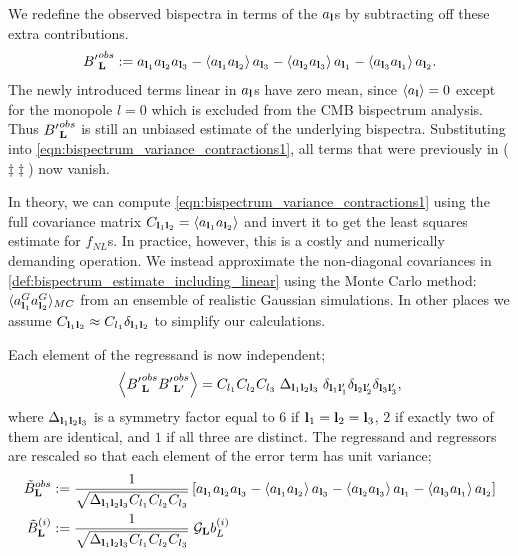We redefine the observed bispectra in terms of the $a_\mathbf{l}$s by subtracting off these extra contributions.
\begin{align}
	{B'}^{obs}_\mathbf{L} := a_{\mathbf{l}_1} a_{\mathbf{l}_2} a_{\mathbf{l}_3} - \left< a_{\mathbf{l}_1} a_{\mathbf{l}_2} \right> a_{\mathbf{l}_3} - \left< a_{\mathbf{l}_2} a_{\mathbf{l}_3} \right> a_{\mathbf{l}_1} - \left< a_{\mathbf{l}_3} a_{\mathbf{l}_1} \right> a_{\mathbf{l}_2}. \label{def:bispectrum_estimate_including_linear}
\end{align}
The newly introduced terms linear in $a_\mathbf{l}$s have zero mean, since $\left< a_\mathbf{l} \right> = 0$ except for the monopole $l=0$ which is excluded from the CMB bispectrum analysis. Thus ${B'}^{obs}_\mathbf{L}$ is still an unbiased estimate of the underlying bispectra. Substituting into \eqref{eqn:bispectrum_variance_contractions1}, all terms that were previously in ($\ddagger\ddagger$) now vanish.

In theory, we can compute \eqref{eqn:bispectrum_variance_contractions1} using the full covariance matrix $C_{\mathbf{l}_1 \mathbf{l}_2} = \left< a_{\mathbf{l}_1} a_{\mathbf{l}_2} \right>$ and invert it to get the least squares estimate for $f_{NL}$s. In practice, however, this is a costly and numerically demanding operation. We instead approximate the non-diagonal covariances in \eqref{def:bispectrum_estimate_including_linear} using the Monte Carlo method: $\langle a_{\mathbf{l}_1}^{G} a_{\mathbf{l}_2}^{G} \rangle_{MC}$ from an ensemble of realistic Gaussian simulations. In other places we assume $C_{\mathbf{l}_1 \mathbf{l}_2} \approx C_{l_1} \delta_{\mathbf{l}_1 \mathbf{l}_2}$ to simplify our calculations.

Each element of the regressand is now independent;
\begin{align}
	\left< {B'}^{obs}_\mathbf{L} {B'}^{obs}_{\mathbf{L}'} \right> = C_{l_1} C_{l_2} C_{l_3} \; \Delta_{\mathbf{l}_1 \mathbf{l}_2 \mathbf{l}_3} \; \delta_{\mathbf{l}_1 \mathbf{l}'_1} \delta_{\mathbf{l}_2 \mathbf{l}'_2} \delta_{\mathbf{l}_3 \mathbf{l}'_3},
\end{align}
where $\Delta_{\mathbf{l}_1 \mathbf{l}_2 \mathbf{l}_3}$ is a symmetry factor equal to $6$ if $\mathbf{l}_1 = \mathbf{l}_2 = \mathbf{l}_3$, $2$ if exactly two of them are identical, and $1$ if all three are distinct. The regressand and regressors are rescaled so that each element of the error term has unit variance;
\begin{align}
	\tilde{B}^{obs}_\mathbf{L} &:= \frac{1}{\sqrt{\Delta_{\mathbf{l}_1 \mathbf{l}_2 \mathbf{l}_3} C_{l_1} C_{l_2} C_{l_3}}} \left[ a_{\mathbf{l}_1} a_{\mathbf{l}_2} a_{\mathbf{l}_3} - \left< a_{\mathbf{l}_1} a_{\mathbf{l}_2} \right> a_{\mathbf{l}_3} - \left< a_{\mathbf{l}_2} a_{\mathbf{l}_3} \right> a_{\mathbf{l}_1} - \left< a_{\mathbf{l}_3} a_{\mathbf{l}_1} \right> a_{\mathbf{l}_2} \right] \\
	\tilde{B}^{(i)}_\mathbf{L} &:= \frac{1}{\sqrt{\Delta_{\mathbf{l}_1 \mathbf{l}_2 \mathbf{l}_3} C_{l_1} C_{l_2} C_{l_3}}} \; \mathcal{G}_{\mathbf{L}} b^{(i)}_{L}
\end{align}

